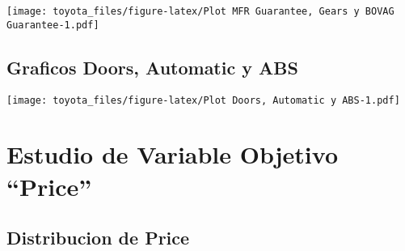 \documentclass[]{article}
\newenvironment{Shaded}{\begin{snugshade}}{\end{snugshade}}
\newcommand{\DataTypeTok}[1]{\textcolor[rgb]{0.13,0.29,0.53}{#1}}
\newcommand{\DecValTok}[1]{\textcolor[rgb]{0.00,0.00,0.81}{#1}}
\newcommand{\KeywordTok}[1]{\textcolor[rgb]{0.13,0.29,0.53}{\textbf{#1}}}
\newcommand{\NormalTok}[1]{#1}
\newcommand{\OperatorTok}[1]{\textcolor[rgb]{0.81,0.36,0.00}{\textbf{#1}}}
\newcommand{\StringTok}[1]{\textcolor[rgb]{0.31,0.60,0.02}{#1}}
\begin{document}
\texttt{[image: toyota\_files/figure-latex/Plot MFR Guarantee, Gears y BOVAG Guarantee-1.pdf]}

\hypertarget{graficos-doors-automatic-y-abs}{%
\subsection{Graficos Doors, Automatic y
ABS}\label{graficos-doors-automatic-y-abs}}

\begin{Shaded}
\end{Shaded}

\texttt{[image: toyota\_files/figure-latex/Plot Doors, Automatic y ABS-1.pdf]}

\hypertarget{estudio-de-variable-objetivo-price}{%
\section{Estudio de Variable Objetivo
``Price''}\label{estudio-de-variable-objetivo-price}}

\hypertarget{distribucion-de-price}{%
\subsection{Distribucion de Price}\label{distribucion-de-price}}

\begin{Shaded}
\end{Shaded}
\end{document}
